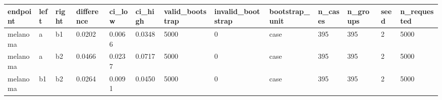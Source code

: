\begin{tabular}{lllllllllllll}
\hline
endpoint & left & right & difference & ci\_low & ci\_high & valid\_bootstrap & invalid\_bootstrap & bootstrap\_unit & n\_cases & n\_groups & seed & n\_requested \\
\hline
melanoma & a & b1 & 0.0202 & 0.0066 & 0.0348 & 5000 & 0 & case & 395 & 395 & 2 & 5000 \\
melanoma & a & b2 & 0.0466 & 0.0237 & 0.0717 & 5000 & 0 & case & 395 & 395 & 2 & 5000 \\
melanoma & b1 & b2 & 0.0264 & 0.0091 & 0.0450 & 5000 & 0 & case & 395 & 395 & 2 & 5000 \\
\hline
\end{tabular}
